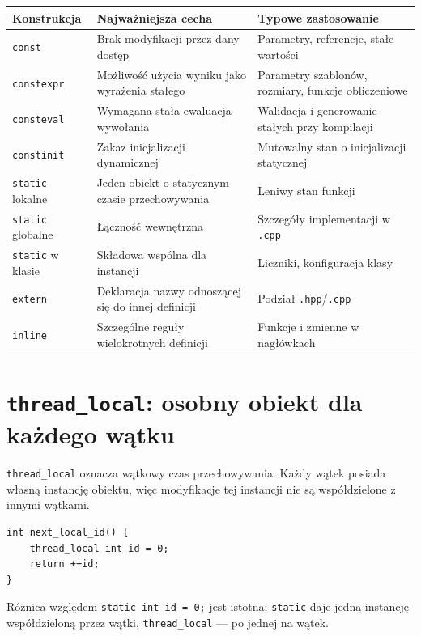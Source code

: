 \begin{center}
\small
\renewcommand{\arraystretch}{1.22}
\begin{tabular}{|p{}|p{}|p{}|}
\hline
\textbf{Konstrukcja} & \textbf{Najważniejsza cecha} & \textbf{Typowe zastosowanie} \\
\hline
\texttt{const} & Brak modyfikacji przez dany dostęp & Parametry, referencje, stałe wartości \\
\hline
\texttt{constexpr} & Możliwość użycia wyniku jako wyrażenia stałego & Parametry szablonów, rozmiary, funkcje obliczeniowe \\
\hline
\texttt{consteval} & Wymagana stała ewaluacja wywołania & Walidacja i generowanie stałych przy kompilacji \\
\hline
\texttt{constinit} & Zakaz inicjalizacji dynamicznej & Mutowalny stan o inicjalizacji statycznej \\
\hline
\texttt{static} lokalne & Jeden obiekt o statycznym czasie przechowywania & Leniwy stan funkcji \\
\hline
\texttt{static} globalne & Łączność wewnętrzna & Szczegóły implementacji w \texttt{.cpp} \\
\hline
\texttt{static} w klasie & Składowa wspólna dla instancji & Liczniki, konfiguracja klasy \\
\hline
\texttt{extern} & Deklaracja nazwy odnoszącej się do innej definicji & Podział \texttt{.hpp}/\texttt{.cpp} \\
\hline
\texttt{inline} & Szczególne reguły wielokrotnych definicji & Funkcje i zmienne w nagłówkach \\
\hline
\end{tabular}
\end{center}

\section{\texttt{thread\_local}: osobny obiekt dla każdego wątku}

\texttt{thread\_local} oznacza wątkowy czas przechowywania. Każdy
wątek posiada własną instancję obiektu, więc modyfikacje tej instancji
nie są współdzielone z innymi wątkami.

\begin{lstlisting}
int next_local_id() {
    thread_local int id = 0;
    return ++id;
}
\end{lstlisting}

Różnica względem \texttt{static int id = 0;} jest istotna:
\texttt{static} daje jedną instancję współdzieloną przez wątki,
\texttt{thread\_local} --- po jednej na wątek.

